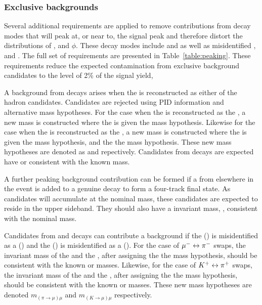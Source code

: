 \subsubsection{Exclusive backgrounds}
\label{sec:selection:exclusive}

Several additional requirements are applied to remove contributions from decay modes that will peak at, or near to, the signal peak and therefore distort the distributions of \ctl, \ctk and $\phi$. These decay modes include \LbTopKmm and \BuToKmm as well as misidentified \BdToJPsiKpi, \BdToPsitwosKpi and \BdToKpimm. The full set of requirements are presented in Table~\ref{table:peaking}. These requirements reduce the expected contamination from exclusive background candidates to the level of 2\% of the signal yield,

A background from \LbTopKmm decays arises when the \proton is reconstructed as either of the hadron candidates. Candidates are rejected using PID information and alternative mass hypotheses. For the case when the \proton is reconstructed as the \pion, a new mass is constructed where the \pion is given the \proton mass hypothesis. Likewise for the case when the \proton is reconstructed as the \kaon, a new mass is constructed where the \kaon is given the \proton mass hypothesis, and the \pion the \kaon mass hypothesis. These new mass hypotheses are denoted as \mSwappKmm and \mDoubleSwappKmm repectively. Candidates from \LbTopKmm decays are expected have \mSwappKmm or \mDoubleSwappKmm consistent with the known \Lb mass.

A further peaking background contribution can be formed if a \pim from elsewhere in the event is added to a genuine \BuToKmm decay to form a four-track final state.  As \BuToKmm candidates will accumulate at the nominal \Bp mass, these candidates are expected to reside in the upper \mkpimm sideband. They should also have a \Kp\mumu invariant mass, \mkmm, consistent with the nominal \Bp mass. %

Candidates from \BdToJPsiKpi and  \BdToPsitwosKpi decays can contribute a background if the \pim (\Kp) is misidentified as a \mun (\mup) and the \mun (\mup) is misidentified as a \pim (\Kp).  For the case of ${\mu^-} \leftrightarrow {\ensuremath{{\pi}^-}}$ swaps, the invariant mass of the \pim and the \mup, after assigning the \pim the \muon mass hypothesis, should be consistent with the known \jpsi or \psitwos masses.  Likewise, for the case of ${{K}^+} \leftrightarrow {\ensuremath{{\pi}^+}}$ swaps, the invariant mass of the \Kp and the \mun, after assigning the \Kp the \muon mass hypothesis, should be consistent with the known \jpsi or \psitwos masses. These new mass hypotheses are denoted $m_{(\pi\to\mu)\mu}$ and $m_{(K\to\mu)\mu}$ respectively.

